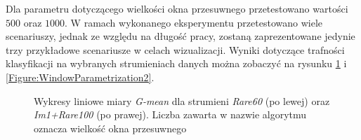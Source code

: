 Dla parametru dotyczącego wielkości okna przesuwnego przetestowano wartości $500$ oraz $1000$. W ramach wykonanego eksperymentu przetestowano wiele scenariuszy, jednak ze względu na długość pracy, zostaną zaprezentowane jedynie trzy przykładowe scenariusze w celach wizualizacji. Wyniki dotyczące trafności klasyfikacji na wybranych strumieniach danych można zobaczyć na rysunku \ref{Figure:WindowParametrization1} i \ref{Figure:WindowParametrization2}.

\begin{figure}[h]
    \centering
    \qquad
    \caption{Wykresy liniowe miary \textit{G-mean} dla strumieni \textit{Rare60} (po lewej) oraz \textit{Im1+Rare100} (po prawej). Liczba zawarta w nazwie algorytmu oznacza wielkość okna przesuwnego}\label{Figure:WindowParametrization1}
\end{figure}

\newpage

